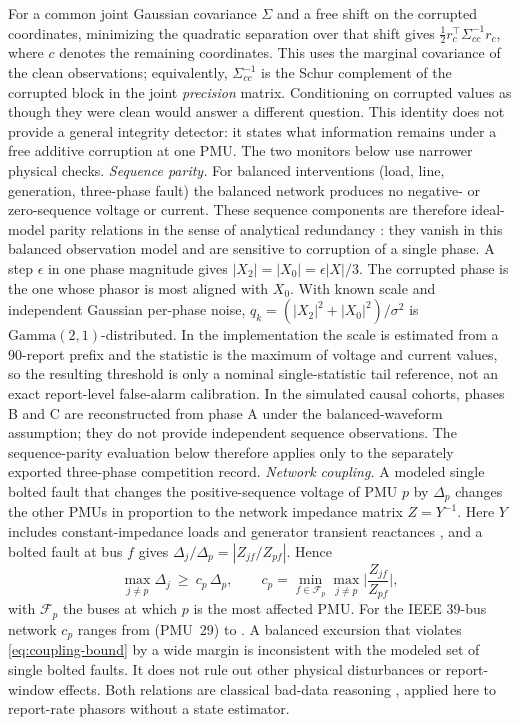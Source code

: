 For a common joint Gaussian covariance $\Sigma$ and a free shift on the
corrupted coordinates, minimizing the quadratic separation over that
shift gives $\tfrac12r_c^\top\Sigma_{cc}^{-1}r_c$, where $c$ denotes the remaining
coordinates. This uses the marginal covariance of the clean observations;
equivalently, $\Sigma_{cc}^{-1}$ is the Schur complement of the corrupted
block in the joint \emph{precision} matrix. Conditioning on corrupted
values as though they were clean would answer a different question. This
identity does not provide a general integrity detector: it states what
information remains under a free additive corruption at one PMU. The two
monitors below use narrower physical checks.
\emph{Sequence parity.} For balanced interventions (load, line,
generation, three-phase fault) the balanced network produces no negative-
or zero-sequence voltage or current. These sequence components are
therefore ideal-model parity relations in the sense of analytical redundancy
\cite{chow1984analytical}: they vanish in this balanced observation model and are sensitive to corruption of a single phase. A step
$\epsilon$ in one phase magnitude gives $|X_2|=|X_0|=\epsilon|X|/3$. The
corrupted phase is the one whose phasor is most aligned with $X_0$.
With known scale and independent Gaussian per-phase noise,
$q_k=(|X_2|^2+|X_0|^2)/\sigma^2$ is
$\mathrm{Gamma}(2,1)$-distributed. In the implementation the scale is
estimated from a 90-report prefix and the statistic is the maximum of
voltage and current values, so the resulting threshold is only a nominal
single-statistic tail reference, not an exact report-level false-alarm
calibration. In the simulated
causal cohorts, phases B and C are reconstructed from phase A under the
balanced-waveform assumption; they do not provide independent sequence
observations. The sequence-parity evaluation below therefore applies only
to the separately exported three-phase competition record.
\emph{Network coupling.} A modeled single bolted fault that changes the positive-sequence voltage of PMU $p$ by
$\Delta_p$ changes the other PMUs in proportion to the network impedance
matrix $Z=Y^{-1}$. Here $Y$ includes constant-impedance loads and generator
transient reactances \cite{pai1989energy}, and a bolted fault at bus $f$
gives $\Delta_j/\Delta_p=|Z_{jf}/Z_{pf}|$. Hence
\begin{equation}
 \max_{j\neq p}\Delta_j\ \ge\ c_p\,\Delta_p,\qquad
 c_p=\min_{f\in\mathcal F_p}\max_{j\neq p}\Big|\frac{Z_{jf}}{Z_{pf}}\Big|,
 \label{eq:coupling-bound}
\end{equation}
with $\mathcal F_p$ the buses at which $p$ is the most affected PMU. For the
IEEE 39-bus network $c_p$ ranges from \IntCouplingMin{} (PMU~29) to
\IntCouplingMax{}. A balanced excursion that violates
\eqref{eq:coupling-bound} by a wide margin is inconsistent with the modeled set of single bolted faults.
It does not rule out other physical disturbances or report-window effects.
Both relations are classical bad-data reasoning \cite{abur2004state},
applied here to report-rate phasors without a state estimator.
